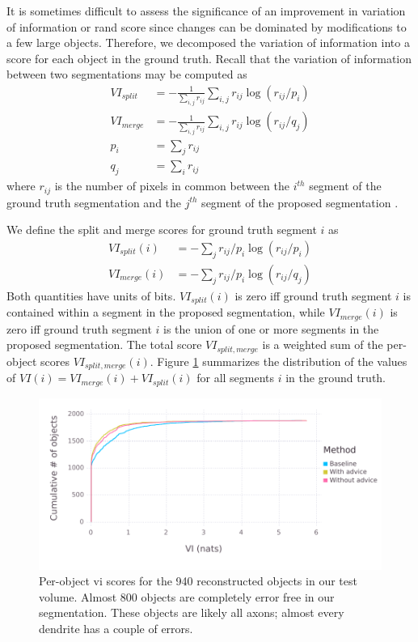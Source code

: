 \documentclass{article}
\begin{document}
It is sometimes difficult to assess the significance of an improvement in variation of information or rand score since changes can be dominated by modifications to a few large objects. Therefore, we decomposed the variation of information into a score for each object in the ground truth. Recall that the variation of information between two segmentations may be computed as 
\begin{align*}
	VI_{split}&=-\frac 1 {\sum_{i,j} r_{ij}} \sum_{i,j} r_{ij} \log(r_{ij}/p_i)\\
	VI_{merge}&=-\frac 1 {\sum_{i,j} r_{ij}} \sum_{i,j} r_{ij} \log(r_{ij}/q_j)\\
	p_i&=\sum_j r_{ij}\\
	q_j&=\sum_i r_{ij}
\end{align*}
where $r_{ij}$ is the number of pixels in common between the $i^{th}$ segment of the ground truth segmentation and the $j^{th}$ segment of the proposed segmentation \cite{vi}.

We define the split and merge scores for ground truth segment $i$ as
\begin{align*}
	VI_{split}(i) &= -\sum_j r_{ij}/p_i \log(r_{ij}/p_i)\\
	VI_{merge}(i) &= -\sum_j r_{ij}/p_i \log(r_{ij}/q_j)
\end{align*}
Both quantities have units of bits. $VI_{split}(i)$ is zero iff ground truth segment $i$ is contained within a segment in the proposed segmentation, while $VI_{merge}(i)$ is zero iff ground truth segment $i$ is the union of one or more segments in the proposed segmentation. The total score $VI_{split, merge}$ is a weighted sum of the per-object scores $VI_{split,merge}(i)$. Figure \ref{fig:decomp_vi_scores} summarizes the distribution of the values of $VI(i)=VI_{merge}(i)+VI_{split}(i)$ for all segments $i$ in the ground truth.
\begin{figure}
\begin{center}
\includegraphics[width=0.65\linewidth]{per_object_vi.pdf}
\caption{Per-object vi scores for the 940 reconstructed objects in our test volume. Almost 800 objects are completely error free in our segmentation. These objects are likely all axons; almost every dendrite has a couple of errors.}
\label{fig:decomp_vi_scores}
\end{center}
\end{figure}
\end{document}
